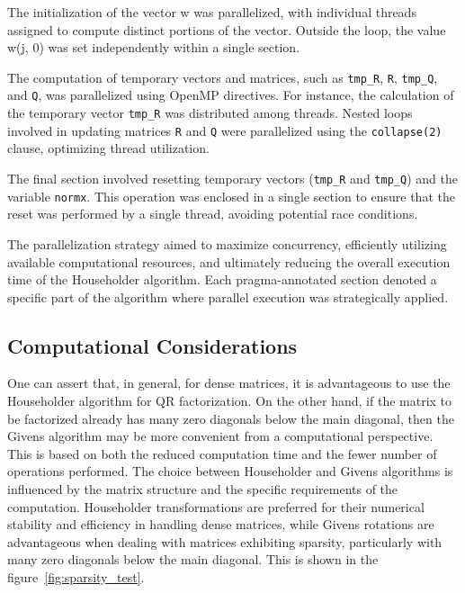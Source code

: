 \documentclass{article}
\begin{document}
The initialization of the vector w was parallelized, with individual threads assigned to compute distinct portions of the vector. Outside the loop, the value w(j, 0) was set independently within a single section.

The computation of temporary vectors and matrices, such as \texttt{tmp\_R}, \texttt{R}, \texttt{tmp\_Q}, and \texttt{Q}, was parallelized using OpenMP directives. For instance, the calculation of the temporary vector \texttt{tmp\_R} was distributed among threads. Nested loops involved in updating matrices \texttt{R} and \texttt{Q} were parallelized using the \texttt{collapse(2)} clause, optimizing thread utilization.

The final section involved resetting temporary vectors (\texttt{tmp\_R} and \texttt{tmp\_Q}) and the variable \texttt{normx}. This operation was enclosed in a single section to ensure that the reset was performed by a single thread, avoiding potential race conditions.


The parallelization strategy aimed to maximize concurrency, efficiently utilizing available computational resources, and ultimately reducing the overall execution time of the Householder algorithm. Each pragma-annotated section denoted a specific part of the algorithm where parallel execution was strategically applied.


\subsection{Computational Considerations}
One can assert that, in general, for dense matrices, it is advantageous to use the Householder algorithm for QR factorization. On the other hand, if the matrix to be factorized already has many zero diagonals below the main diagonal, then the Givens algorithm may be more convenient from a computational perspective. This is based on both the reduced computation time and the fewer number of operations performed. The choice between Householder and Givens algorithms is influenced by the matrix structure and the specific requirements of the computation. Householder transformations are preferred for their numerical stability and efficiency in handling dense matrices, while Givens rotations are advantageous when dealing with matrices exhibiting sparsity, particularly with many zero diagonals below the main diagonal. This is shown in the figure~\ref{fig:sparsity_test}.
\end{document}
